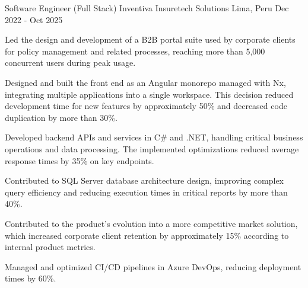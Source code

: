 

\begin{cventries}

  \cventry
    {Software Engineer (Full Stack)} %
    {Inventiva Insuretech Solutions} %
    {Lima, Peru} %
    {Dec 2022 - Oct 2025} %
    {
      \begin{cvitems} %
        \item {Led the design and development of a B2B portal suite used by corporate clients for policy management and related processes, reaching more than 5,000 concurrent users during peak usage.}
        \item {Designed and built the front end as an Angular monorepo managed with Nx, integrating multiple applications into a single workspace. This decision reduced development time for new features by approximately 50\% and decreased code duplication by more than 30\%.}
        \item {Developed backend APIs and services in C\# and .NET, handling critical business operations and data processing. The implemented optimizations reduced average response times by 35\% on key endpoints.}
        \item {Contributed to SQL Server database architecture design, improving complex query efficiency and reducing execution times in critical reports by more than 40\%.}
        \item {Contributed to the product's evolution into a more competitive market solution, which increased corporate client retention by approximately 15\% according to internal product metrics.}
        \item {Managed and optimized CI/CD pipelines in Azure DevOps, reducing deployment times by 60\%.}
      \end{cvitems}
    }

\end{cventries}
